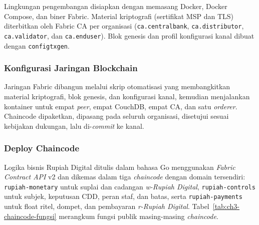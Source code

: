 Lingkungan pengembangan disiapkan dengan memasang Docker, Docker Compose, dan
biner Fabric. Material kriptografi (sertifikat MSP dan TLS) diterbitkan oleh
Fabric CA per organisasi (\texttt{ca.centralbank}, \texttt{ca.distributor}, \texttt{ca.validator}, dan \texttt{ca.enduser}). Blok genesis dan profil konfigurasi kanal
dibuat dengan \texttt{configtxgen}.

\subsubsection{Konfigurasi Jaringan Blockchain}

Jaringan Fabric dibangun melalui skrip otomatisasi yang membangkitkan material
kriptografi, blok genesis, dan konfigurasi kanal, kemudian menjalankan kontainer
untuk empat \textit{peer}, empat CouchDB, empat CA, dan satu \textit{orderer}. Chaincode
dipaketkan, dipasang pada seluruh organisasi, disetujui sesuai kebijakan
dukungan, lalu di-\textit{commit} ke kanal.

\subsubsection{Deploy Chaincode}

Logika bisnis Rupiah Digital ditulis dalam bahasa Go menggunakan \textit{Fabric Contract API} v2 dan dikemas dalam tiga \textit{chaincode} dengan domain tersendiri: \texttt{rupiah-monetary} untuk suplai dan cadangan \textit{w-Rupiah Digital}, \texttt{rupiah-controls} untuk subjek, keputusan CDD, peran staf, dan batas, serta \texttt{rupiah-payments} untuk float ritel, dompet, dan pembayaran \textit{r-Rupiah Digital}. Tabel~\ref{tab:ch3-chaincode-fungsi} merangkum fungsi publik masing-masing \textit{chaincode}.

